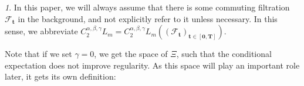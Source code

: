 \documentclass[11pt,oneside,english,reqno]{amsart}
\numberwithin{equation}{section}
\numberwithin{figure}{section}
\theoremstyle{plain}
\theoremstyle{definition}
\theoremstyle{remark}
\newtheorem{rem}[thm]{\protect\remarkname}
\theoremstyle{plain}
\theoremstyle{plain}
\theoremstyle{plain}
\theoremstyle{plain}
\theoremstyle{plain}
\providecommand{\remarkname}{Remark}
\newcommand{\cF}{\mathcal{F}}
\newcommand{\bT}{\mathbf{T}}
\newcommand{\boo}{\mathbf{0}}
\newcommand{\bu}{\mathbf{u}}
\newcommand{\bs}{\mathbf{s}}
\newcommand{\bt}{\mathbf{t}}
\newcommand{\norm}[1]{\left\lVert #1\right\rVert}
\newcommand{\abs}[1]{\left\lvert #1\right\rvert}
\begin{document}
\begin{rem}
    In this paper, we will always assume that there is some commuting filtration $\cF_\bt$ in the background, and not explicitly refer to it unless necessary. In this sense, we abbreviate $C_2^{\alpha,\beta,\gamma} L_m = C_2^{\alpha,\beta,\gamma} L_m((\cF_\bt)_{\bt\in[\boo,\bT]})$.
\end{rem}


\noindent
Note that if we set $\gamma = 0$, we get the space of $\Xi$, such that the conditional expectation does not improve regularity. As this space will play an important role later, it gets its own definition:
\end{document}
